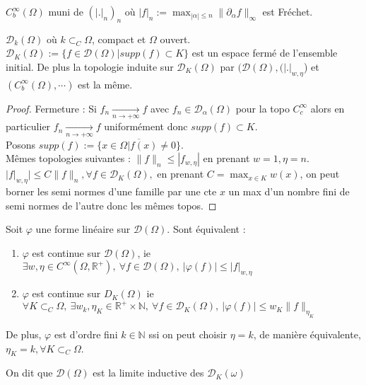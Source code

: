 \begin{ex}
    $C^\infty _b(\Omega)$ muni de $(|.|_n)_n$   où $|f|_n:=\max_{|\alpha |\le n}\|\partial _\alpha f\|_{\infty }$ est Fréchet.
\end{ex}
\begin{proposition}
    $\mathcal{D}_k(\Omega)$   où $k\subset _C\Omega$, compact et $\Omega$  ouvert. $\mathcal{D}_K(\Omega):=\{f\in \mathcal{D}(\Omega)|supp(f)\subset K\} $  est un espace fermé de l'ensemble initial. De plus la topologie induite sur $\mathcal{D}_K(\Omega)$ par $(\mathcal{D}(\Omega),(|.|_{w, \eta}$) et $(C^\infty _b(\Omega),\cdots)$ est la même.
\end{proposition}
\begin{proof}
    Fermeture : Si $f_n \underset{n\to +\infty}{\longrightarrow} f$ avec $f_n\in \mathcal{D}_\alpha (\Omega)$ pour la topo $C^\infty _c$ alors en particulier $f_n \underset{n\to +\infty}{\longrightarrow} f$ uniformément donc $supp(f)\subset K$.\\
    Posons $supp(f):=\overline{\{x\in \Omega|f(x)\neq 0\}}$.\\
    Mêmes topologies suivantes : $\|f\|_n\le |f_{w, \eta}|$ en prenant $w=1, \eta=n$. $|f|_{w, \eta}|\le C\|f\|_n, \forall f\in \mathcal{D}_K(\Omega),$ en prenant $C=\max_{x\in K}w(x)$, on peut borner les semi normes d'une famille par une cte $x$ un max d'un nombre fini de semi normes de l'autre donc les mêmes topos.
\end{proof}
\begin{proposition}
    Soit $\varphi $  une forme linéaire sur $\mathcal{D}(\Omega)$. Sont équivalent :
    \begin{enumerate}
        \item $\varphi $  est continue sur $\mathcal{D}(\Omega)$, ie $\exists w, \eta\in C^\infty (\Omega,\mathbb{R} ^+),\ \forall f\in \mathcal{D}(\Omega),\ |\varphi (f)|\le |f|_{w, \eta} $
        \item $\varphi $  est continue sur $D_K(\Omega)$  ie $\forall K\subset _C\Omega,\ \exists w_k, \eta_K\in \mathbb{R} ^+\times \mathbb{N} ,\ \forall f\in \mathcal{D}_K(\Omega),\ |\varphi (f)|\le w_K\|f\|_{\eta_K}  $
    \end{enumerate}
    De plus, $\varphi $  est d'ordre fini $k\in \mathbb{N} $  ssi on peut choisir $\eta=k$, de manière équivalente, $\eta_K=k,\forall K\subset _C\Omega $.
\end{proposition}
\begin{remarque}
    On dit que $\mathcal{D}(\Omega)$ est la limite inductive des $\mathcal{D}_K(\omega)$
\end{remarque}


